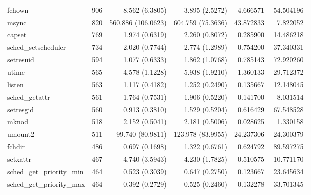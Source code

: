 \begin{longtable}{>{\ttfamily}lrrrrr}
                         fchown &         906 &           8.562 (6.3805) &           3.895 (2.5272) &       -4.666571 &   -54.504196 \\
                          msync &         820 &       560.886 (106.0623) &        604.759 (75.3636) &       43.872833 &     7.822052 \\
                         capset &         769 &           1.974 (0.6319) &           2.260 (0.8072) &        0.285900 &    14.486218 \\
            sched\_setscheduler &         734 &           2.020 (0.7744) &           2.774 (1.2989) &        0.754200 &    37.340331 \\
                      setresuid &         594 &           1.077 (0.6333) &           1.862 (1.0768) &        0.785143 &    72.920260 \\
                          utime &         565 &           4.578 (1.1228) &           5.938 (1.9210) &        1.360133 &    29.712372 \\
                         listen &         563 &           1.117 (0.4182) &           1.252 (0.2490) &        0.135667 &    12.148045 \\
                 sched\_getattr &         561 &           1.764 (0.7531) &           1.906 (0.5220) &        0.141700 &     8.031514 \\
                      setresgid &         560 &           0.913 (0.3810) &           1.529 (0.5204) &        0.616429 &    67.548528 \\
                          mknod &         518 &           2.152 (0.5041) &           2.181 (0.5006) &        0.028625 &     1.330158 \\
                        umount2 &         511 &         99.740 (80.9811) &        123.978 (83.9955) &       24.237306 &    24.300379 \\
                         fchdir &         486 &           0.697 (0.1698) &           1.322 (0.6761) &        0.624792 &    89.597275 \\
                       setxattr &         467 &           4.740 (3.5943) &           4.230 (1.7825) &       -0.510575 &   -10.771170 \\
      sched\_get\_priority\_min &         464 &           0.523 (0.3039) &           0.647 (0.2750) &        0.123667 &    23.645634 \\
      sched\_get\_priority\_max &         464 &           0.392 (0.2729) &           0.525 (0.2460) &        0.132278 &    33.701345 \\

\end{longtable}
